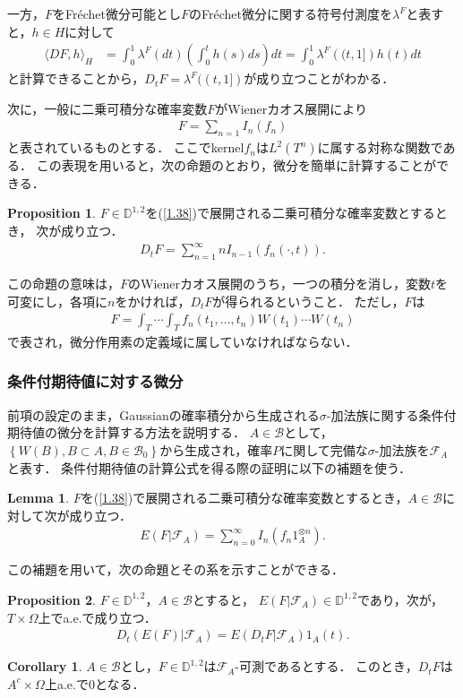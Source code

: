 \documentclass[a4paper,10pt]{jsarticle}
\theoremstyle{definition}
\newtheorem{lemma}{Lemma}
\newtheorem{proposition}{Proposition}
\newtheorem{corollary}{Corollary}
\newcommand{\eq}[1]{\begin{align}#1\end{align}}
\begin{document}
一方，$F$をFr\'echet微分可能とし$F$のFr\'echet微分に関する符号付測度を$\lambda^F$と表すと，$h\in H$に対して
\eq{\langle DF,h\rangle_H
	&=\int_0^1\lambda^F(dt)\left(\int_0^th(s)ds\right)dt
	=\int_0^1\lambda^F\left((t,1]\right)h(t)dt}
と計算できることから，$D_tF=\lambda^F((t,1])$が成り立つことがわかる．

次に，一般に二乗可積分な確率変数$F$がWienerカオス展開により
\eq{F=\sum_{n=1}I_n(f_n)\label{1.38}}
と表されているものとする．
ここでkernel$f_n$は$L^2(T^n)$に属する対称な関数である．
この表現を用いると，次の命題のとおり，微分を簡単に計算することができる．
\begin{proposition}\label{prop1.2.7}
$F\in\mathbb{D}^{1,2}$を(\ref{1.38})で展開される二乗可積分な確率変数とするとき， 次が成り立つ．
\eq{D_tF=\sum^\infty_{n=1}nI_{n-1}\left(f_n(\cdot,t)\right).}
\end{proposition}
この命題の意味は，$F$のWienerカオス展開のうち，一つの積分を消し，変数$t$を可変にし，各項に$n$をかければ，$D_tF$が得られるということ．
ただし，$F$は
\eq{F=\int_T\cdots\int_Tf_n(t_1,...,t_n)W(t_1)\cdots W(t_n)}
で表され，微分作用素の定義域に属していなければならない．

\subsubsection{条件付期待値に対する微分}
前項の設定のまま，Gaussianの確率積分から生成される$\sigma$-加法族に関する条件付期待値の微分を計算する方法を説明する．
$A\in\mathcal{B}$として，$\left\{W(B),B\subset A,B\in\mathcal{B}_0\right\}$から生成され，確率$P$に関して完備な$\sigma$-加法族を$\mathcal{F}_A$と表す．
条件付期待値の計算公式を得る際の証明に以下の補題を使う．
\begin{lemma}\label{lem1.2.5}
$F$を(\ref{1.38})で展開される二乗可積分な確率変数とするとき，$A\in\mathcal{B}$に対して次が成り立つ．
\eq{E\left(F|\mathcal{F}_A\right)=\sum^\infty_{n=0}I_n(f_n1_A^{\otimes n}).}
\end{lemma}
この補題を用いて，次の命題とその系を示すことができる．
\begin{proposition}\label{prop1.2.8}
$F\in\mathbb{D}^{1,2}$，$A\in\mathcal{B}$とすると，
$E\left(F|\mathcal{F}_A\right)\in\mathbb{D}^{1,2}$であり，次が，$T\times\Omega$上でa.e.で成り立つ．
\eq{D_t\left(E(F)|\mathcal{F}_A\right)=E\left(D_tF|\mathcal{F}_A\right)1_A(t).}
\end{proposition}
\begin{corollary}\label{cor1.2.1}
$A\in\mathcal{B}$とし，$F\in\mathbb{D}^{1,2}$は$\mathcal{F}_A$-可測であるとする．
このとき，$D_tF$は$A^c\times\Omega$上a.e.で$0$となる．
\end{corollary}
\end{document}
